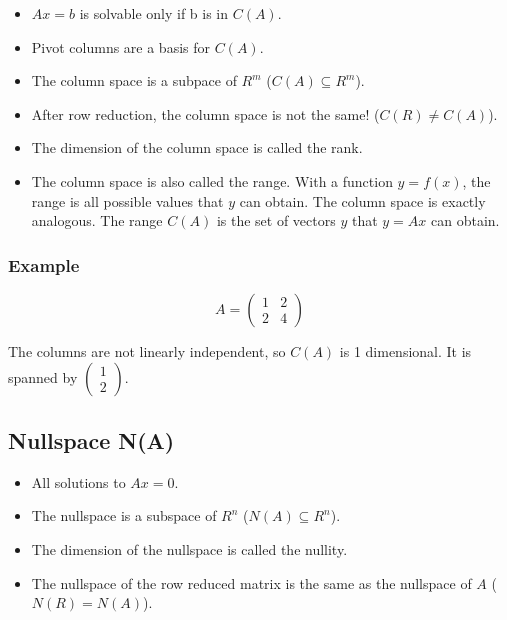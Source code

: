 \documentclass[12pt]{article}
\begin{document}
\begin{itemize}
\begin{itemize}
\item $Ax=b$ is solvable only if b is in $C(A)$.

\item Pivot columns are a basis for $C(A)$.

\item The column space is a subpace of $R^m$ ($C(A) \subseteq R^m$).

\item After row reduction, the column space is not the same! ($C(R) \neq C(A)$).

\item The dimension of the column space is called the rank.

\item The column space is also called the range.  With a function $y = f(x)$, the range is all possible values that $y$ can obtain.  The column space is exactly analogous.  The range $C(A)$ is the set of vectors $y$ that $y = Ax$ can obtain.
\end{itemize}

\subsubsection{Example}
\begin{equation*}
A=
\begin{pmatrix}
 1 & 2\\
2 & 4
\end{pmatrix} 
\end{equation*}

The columns are not linearly independent, so $C(A)$ is 1 dimensional. It is spanned by $\begin{pmatrix} 1 \\ 2 \end{pmatrix}$.

\subsection{Nullspace N(A)}
\begin{itemize}
\item All solutions to $Ax = 0$.

\item The nullspace is a subspace of $R^n$ ($N(A) \subseteq R^n$).

\item The dimension of the nullspace is called the nullity.

\item The nullspace of the row reduced matrix is the same as the nullspace of $A$ ($N(R) = N(A)$).
\end{itemize}


\end{itemize}
\end{document}
